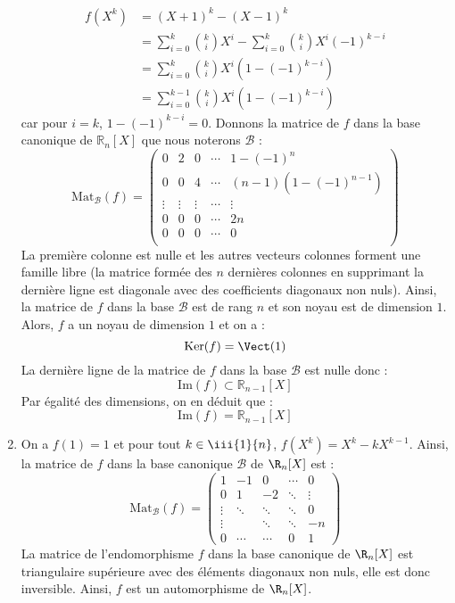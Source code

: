 \documentclass[a4paper,twoside,french,11pt]{VcCours}
\begin{document}
\begin{enumerate}
\begin{align*}
f(X^k) & = (X+1)^k - (X-1)^k \\
& = \sum_{i=0}^k \binom{k}{i} X^i - \sum_{i=0}^k \binom{k}{i} X^i (-1)^{k-i} \\
& =\sum_{i=0}^k \binom{k}{i} X^i  (1-(-1)^{k-i}) \\
& =\sum_{i=0}^{k-1} \binom{k}{i} X^i  (1-(-1)^{k-i}) 
\end{align*}
car pour $i=k$, $1-(-1)^{k-i}=0$. Donnons la matrice de $f$ dans la base canonique de $\mathbb{R}_n[X]$ que nous noterons $\mathcal{B}$ :
$$ \textrm{Mat}_{\mathcal{B}}(f) = \begin{pmatrix}
0 &   2 & 0 &  \cdots & 1-(-1)^n  \\
0 &  0  & 4 & \cdots &  (n-1) (1-(-1)^{n-1}) \\
\vdots & \vdots & \vdots & \cdots &  \vdots \\
0 &  0 & 0 &  \cdots & 2n  \\
0 &  0 & 0 &  \cdots& 0 \\
\end{pmatrix}$$
La première colonne est nulle et les autres vecteurs colonnes forment une famille libre (la matrice formée des $n$ dernières colonnes en supprimant la dernière ligne est diagonale avec des coefficients diagonaux non nuls). Ainsi, la matrice de $f$ dans la base $\mathcal{B}$ est de rang $n$ et son noyau est de dimension $1$. Alors, $f$ a un noyau de dimension $1$ et on a :
$$ \textrm{Ker}(f) = \Vect(1) $$
La dernière ligne de la matrice de $f$ dans la base $\mathcal{B}$ est nulle donc :
$$ \textrm{Im}(f) \subset \mathbb{R}_{n-1}[X]$$
Par égalité des dimensions, on en déduit que :
$$  \textrm{Im}(f) = \mathbb{R}_{n-1}[X]$$
\item On a $f(1)=1$ et pour tout $k \in \iii{1}{n}$, $f(X^k)=X^k-kX^{k-1}$. Ainsi, la matrice de $f$ dans la base canonique $\mathcal{B}$ de $\R_n[X]$ est : 
$$\textrm{Mat}_{\mathcal{B}}(f)=\begin{pmatrix}
1&-1&0&\cdots&0\\0&1&-2&\ddots&\vdots\\ \vdots&\ddots&\ddots&\ddots&0\\\vdots&&\ddots&\ddots&-n\\0&\cdots&\cdots&0&1
\end{pmatrix}$$
La matrice de l'endomorphisme $f$ dans la base canonique de $\R_n[X]$ est triangulaire supérieure avec des éléments diagonaux non nuls, elle est donc inversible. Ainsi, $f$ est un automorphisme de $\R_n[X]$.
\end{enumerate}
\end{document}
